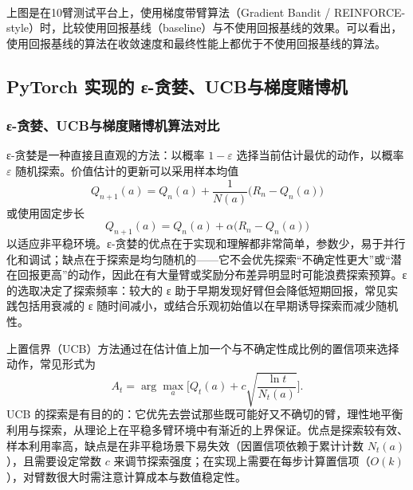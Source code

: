 \documentclass[11pt]{ctexart}
\begin{document}
    \begin{center}
    \end{center}
    { \hspace*{\fill} \\}
    
    上图是在10臂测试平台上，使用梯度带臂算法（Gradient Bandit /
REINFORCE-style）时，比较使用回报基线（baseline）与不使用回报基线的效果。可以看出，使用回报基线的算法在收敛速度和最终性能上都优于不使用回报基线的算法。

    \hypertarget{pytorch-ux5b9eux73b0ux7684-ux3b5-ux8d2aux5a6aucbux4e0eux68afux5ea6ux8d4cux535aux673a}{%
\subsection{PyTorch 实现的
ε-贪婪、UCB与梯度赌博机}\label{pytorch-ux5b9eux73b0ux7684-ux3b5-ux8d2aux5a6aucbux4e0eux68afux5ea6ux8d4cux535aux673a}}

\hypertarget{ux3b5-ux8d2aux5a6aucbux4e0eux68afux5ea6ux8d4cux535aux673aux7b97ux6cd5ux5bf9ux6bd4}{%
\subsubsection{ε-贪婪、UCB与梯度赌博机算法对比}\label{ux3b5-ux8d2aux5a6aucbux4e0eux68afux5ea6ux8d4cux535aux673aux7b97ux6cd5ux5bf9ux6bd4}}

ε-贪婪是一种直接且直观的方法：以概率 \(1-\varepsilon\)
选择当前估计最优的动作，以概率 \(\varepsilon\)
随机探索。价值估计的更新可以采用样本均值
\[Q_{n+1}(a)=Q_n(a)+\frac{1}{N(a)}\big(R_n-Q_n(a)\big)\] 或使用固定步长
\[Q_{n+1}(a)=Q_n(a)+\alpha\big(R_n-Q_n(a)\big)\]
以适应非平稳环境。ε-贪婪的优点在于实现和理解都非常简单，参数少，易于并行化和调试；缺点在于探索是均匀随机的------它不会优先探索``不确定性更大''或``潜在回报更高''的动作，因此在有大量臂或奖励分布差异明显时可能浪费探索预算。ε
的选取决定了探索频率：较大的 ε
助于早期发现好臂但会降低短期回报，常见实践包括用衰减的 ε
随时间减小，或结合乐观初始值以在早期诱导探索而减少随机性。

上置信界（UCB）方法通过在估计值上加一个与不确定性成比例的置信项来选择动作，常见形式为
\[A_t=\arg\max_a\Big[Q_t(a)+c\sqrt{\frac{\ln t}{N_t(a)}}\Big].\] UCB
的探索是有目的的：它优先去尝试那些既可能好又不确切的臂，理性地平衡利用与探索，从理论上在平稳多臂环境中有渐近的上界保证。优点是探索较有效、样本利用率高，缺点是在非平稳场景下易失效（因置信项依赖于累计计数
\(N_t(a)\)），且需要设定常数 \(c\)
来调节探索强度；在实现上需要在每步计算置信项（\(O(k)\)），对臂数很大时需注意计算成本与数值稳定性。
\end{document}
